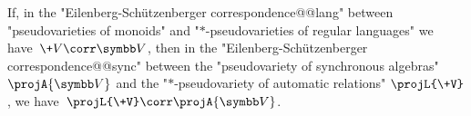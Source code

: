 \begin{theorem}
	\AP\label{thm:lifting-theorem-monoids-pseudovarieties}
	If, in the "Eilenberg-Schützenberger correspondence@@lang"
	between "pseudovarieties of mon\-oids" and "$\ast$-pseudovarieties of regular languages"
	we have~$\+V \corr \B{V}$,
	then in the "Eilenberg-Schützenberger correspondence@@sync"
	between the "pseudovariety of synchronous algebras" $\projA{\B{V}}$ and
	the "$\ast$-pseudovariety of automatic relations" $\projL{\+V}$,
	we have~$\projL{\+V} \corr \projA{\B{V}}$.
\end{theorem}